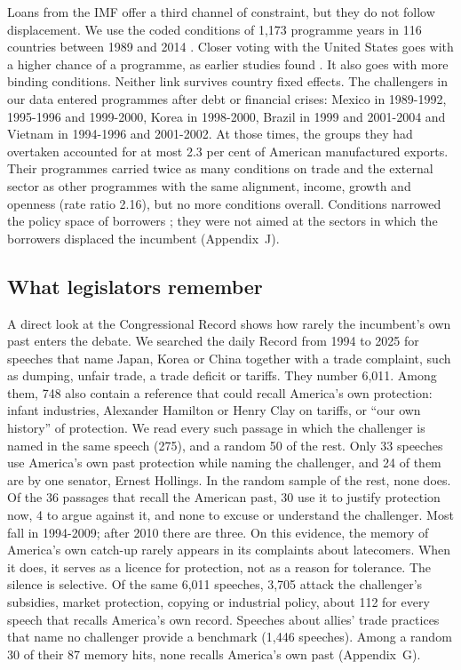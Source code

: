 \documentclass[review,authoryear,12pt]{elsarticle}
\begin{document}
Loans from the IMF offer a third channel of constraint, but they do not follow displacement. We use the coded conditions of 1,173 programme years in 116 countries between 1989 and 2014 \citep{stubbs2020}. Closer voting with the United States goes with a higher chance of a programme, as earlier studies found \citep{thacker1999,barro2005}. It also goes with more binding conditions. Neither link survives country fixed effects. The challengers in our data entered programmes after debt or financial crises: Mexico in 1989-1992, 1995-1996 and 1999-2000, Korea in 1998-2000, Brazil in 1999 and 2001-2004 and Vietnam in 1994-1996 and 2001-2002. At those times, the groups they had overtaken accounted for at most 2.3 per cent of American manufactured exports. Their programmes carried twice as many conditions on trade and the external sector as other programmes with the same alignment, income, growth and openness (rate ratio 2.16), but no more conditions overall. Conditions narrowed the policy space of borrowers \citep{kentikelenis2016}; they were not aimed at the sectors in which the borrowers displaced the incumbent (Appendix~J).


\subsection{What legislators remember}\label{sec:memory}

A direct look at the Congressional Record shows how rarely the incumbent's own past enters the debate. We searched the daily Record from 1994 to 2025 for speeches that name Japan, Korea or China together with a trade complaint, such as dumping, unfair trade, a trade deficit or tariffs. They number 6,011. Among them, 748 also contain a reference that could recall America's own protection: infant industries, Alexander Hamilton or Henry Clay on tariffs, or ``our own history'' of protection. We read every such passage in which the challenger is named in the same speech (275), and a random 50 of the rest. Only 33 speeches use America's own past protection while naming the challenger, and 24 of them are by one senator, Ernest Hollings. In the random sample of the rest, none does. Of the 36 passages that recall the American past, 30 use it to justify protection now, 4 to argue against it, and none to excuse or understand the challenger. Most fall in 1994-2009; after 2010 there are three. On this evidence, the memory of America's own catch-up rarely appears in its complaints about latecomers. When it does, it serves as a licence for protection, not as a reason for tolerance. The silence is selective. Of the same 6,011 speeches, 3,705 attack the challenger's subsidies, market protection, copying or industrial policy, about 112 for every speech that recalls America's own record. Speeches about allies' trade practices that name no challenger provide a benchmark (1,446 speeches). Among a random 30 of their 87 memory hits, none recalls America's own past (Appendix~G).
\end{document}
